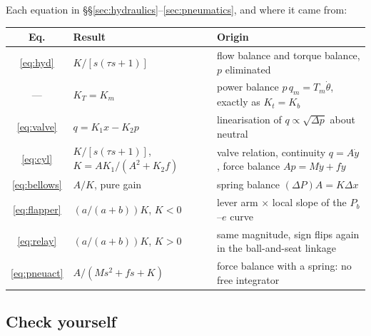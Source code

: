 \documentclass[11pt,a4paper]{article}
\begin{document}
\begin{keyidea}
Each equation in \S\S\ref{sec:hydraulics}--\ref{sec:pneumatics}, and where it
came from:
\begin{center}
\begin{tabular}{clP{6.5cm}}
\toprule
Eq. & Result & Origin \\
\midrule
\eqref{eq:hyd} & $K/[s(\tau s+1)]$
   & flow balance and torque balance, $p$ eliminated \\
--- & $K_{T}=K_{m}$
   & power balance $p\,q_{m}=T_{m}\dot\theta$, exactly as $K_{t}=K_{b}$ \\
\eqref{eq:valve} & $q=K_{1}x-K_{2}p$
   & linearisation of $q\propto\sqrt{\Delta p}$ about neutral \\
\eqref{eq:cyl} & $K/[s(\tau s+1)]$, $K=AK_{1}/(A^{2}+K_{2}f)$
   & valve relation, continuity $q=A\dot y$, force balance $Ap=M\ddot y+f\dot y$ \\
\eqref{eq:bellows} & $A/K$, pure gain
   & spring balance $(\Delta P)A=K\Delta x$ \\
\eqref{eq:flapper} & $(a/(a+b))K$, $K<0$
   & lever arm $\times$ local slope of the $P_b$--$e$ curve \\
\eqref{eq:relay} & $(a/(a+b))K$, $K>0$
   & same magnitude, sign flips again in the ball-and-seat linkage \\
\eqref{eq:pneuact} & $A/(Ms^{2}+fs+K)$
   & force balance with a spring: no free integrator \\
\bottomrule
\end{tabular}
\end{center}
\end{keyidea}

\subsection*{Check yourself}
\end{document}
